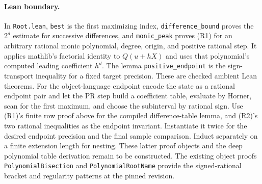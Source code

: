 \paragraph{Lean boundary.}
In \texttt{Root.lean}, \texttt{best} is the first maximizing index,
\texttt{difference\_bound} proves the $2^d$ estimate for successive
differences, and \texttt{monic\_peak} proves (R1) for an arbitrary
rational monic polynomial, degree, origin, and positive rational step.
It applies mathlib's factorial identity to $Q(u+hX)$ and uses that
polynomial's computed leading coefficient $h^d$. The lemma
\texttt{positive\_endpoint} is the sign-transport inequality for a
fixed target precision. These are checked ambient Lean theorems.
For the object-language endpoint encode the state as a rational endpoint
pair and let the PR step build a coefficient table, evaluate by Horner,
scan for the first maximum, and choose the subinterval by rational sign.
Use (R1)'s finite row proof above for the compiled difference-table
lemma, and (R2)'s two rational inequalities as the endpoint invariant.
Instantiate it twice for the desired endpoint precision and the final
sample comparison. Induct separately on a finite extension length for
nesting. These latter proof objects and the deep polynomial table
derivation remain to be constructed. The existing object proofs
\texttt{PolynomialBisection} and \texttt{PolynomialRootName} provide
the signed-rational bracket and regularity patterns at the pinned
revision.
